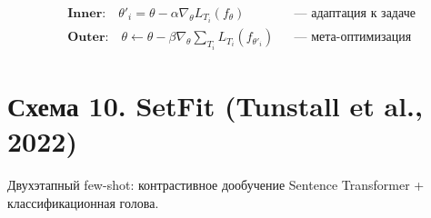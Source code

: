 \documentclass[12pt,a4paper]{article}
\begin{document}
\begin{align*}
&\textbf{Inner:}\quad \theta'_i = \theta - \alpha \nabla_\theta L_{T_i}(f_\theta) && \text{--- адаптация к задаче}\\
&\textbf{Outer:}\quad \theta \leftarrow \theta - \beta \nabla_\theta \sum_{T_i} L_{T_i}(f_{\theta'_i}) && \text{--- мета-оптимизация}
\end{align*}


\newpage
\section*{Схема 10. SetFit (Tunstall et al., 2022)}

Двухэтапный few-shot: контрастивное дообучение Sentence Transformer + классификационная голова.
\end{document}
